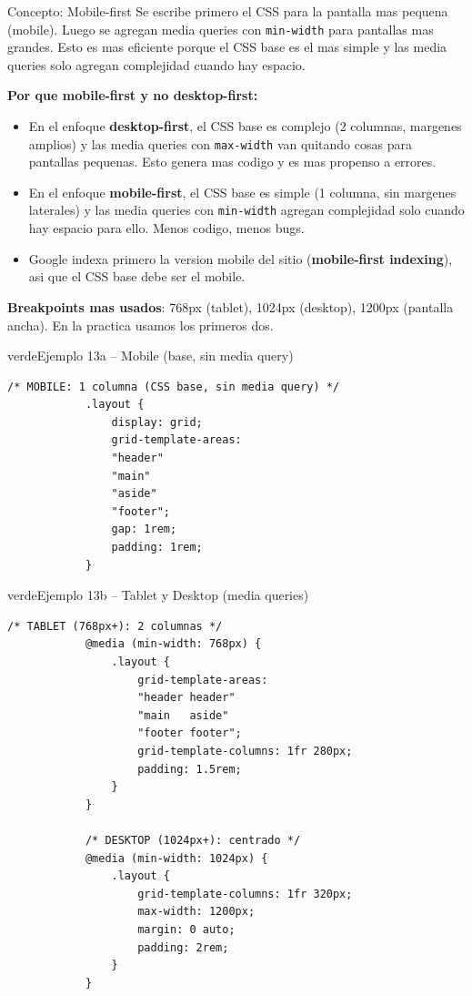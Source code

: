 \documentclass[11pt,a4paper]{article}
\begin{document}
	\begin{cajaconcepto}{Concepto: Mobile-first}
		Se escribe primero el CSS para la pantalla mas pequena (mobile). Luego se agregan media queries con \texttt{min-width} para pantallas mas grandes. Esto es mas eficiente porque el CSS base es el mas simple y las media queries solo agregan complejidad cuando hay espacio.
		
		\textbf{Por que mobile-first y no desktop-first:}
		\begin{itemize}[leftmargin=1.2em,itemsep=3pt]
			\item En el enfoque \textbf{desktop-first}, el CSS base es complejo (2 columnas, margenes amplios) y las media queries con \texttt{max-width} van quitando cosas para pantallas pequenas. Esto genera mas codigo y es mas propenso a errores.
			\item En el enfoque \textbf{mobile-first}, el CSS base es simple (1 columna, sin margenes laterales) y las media queries con \texttt{min-width} agregan complejidad solo cuando hay espacio para ello. Menos codigo, menos bugs.
			\item Google indexa primero la version mobile del sitio (\textbf{mobile-first indexing}), asi que el CSS base debe ser el mobile.
		\end{itemize}
		
		\textbf{Breakpoints mas usados}: 768px (tablet), 1024px (desktop), 1200px (pantalla ancha). En la practica usamos los primeros dos.
	\end{cajaconcepto}
	
	\begin{cajacodigo}{verde}{Ejemplo 13a -- Mobile (base, sin media query)}
		\begin{lstlisting}[style=codecss]
			/* MOBILE: 1 columna (CSS base, sin media query) */
			.layout {
				display: grid;
				grid-template-areas:
				"header"
				"main"
				"aside"
				"footer";
				gap: 1rem;
				padding: 1rem;
			}
		\end{lstlisting}
	\end{cajacodigo}
	
	\begin{cajacodigo}{verde}{Ejemplo 13b -- Tablet y Desktop (media queries)}
		\begin{lstlisting}[style=codecss]
			/* TABLET (768px+): 2 columnas */
			@media (min-width: 768px) {
				.layout {
					grid-template-areas:
					"header header"
					"main   aside"
					"footer footer";
					grid-template-columns: 1fr 280px;
					padding: 1.5rem;
				}
			}
			
			/* DESKTOP (1024px+): centrado */
			@media (min-width: 1024px) {
				.layout {
					grid-template-columns: 1fr 320px;
					max-width: 1200px;
					margin: 0 auto;
					padding: 2rem;
				}
			}
		\end{lstlisting}
	\end{cajacodigo}
	
\end{document}
